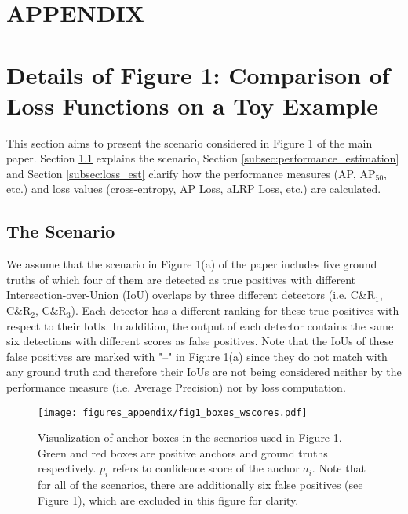 \documentclass{article}
\begin{document}
\section*{APPENDIX}




\renewcommand{\thefigure}{A.\arabic{figure}}
\renewcommand{\thetable}{A.\arabic{table}}
\renewcommand{\thetheorem}{A.\arabic{theorem}}
\renewcommand{\theequation}{A.\arabic{equation}}
\renewcommand{\thealgorithm}{A.\arabic{algorithm}}

\section{Details of Figure 1: Comparison of Loss Functions on a Toy Example}
\label{sec:Teaser}



This section aims to present the scenario considered in Figure 1 of the main paper. Section \ref{subsec:the_scenario} explains the scenario, Section \ref{subsec:performance_estimation} and Section \ref{subsec:loss_est} clarify how the performance measures (AP, $\mathrm{AP_{50}}$, etc.) and loss values (cross-entropy, AP Loss, aLRP Loss, etc.) are calculated.

\subsection{The Scenario}
\label{subsec:the_scenario}
We assume that the scenario in Figure 1(a) of the paper includes five ground truths of which four of them are detected as true positives with different Intersection-over-Union (IoU) overlaps by three different detectors (i.e. $\mathrm{C\&R_1}$, $\mathrm{C\&R_2}$, $\mathrm{C\&R_3}$). Each detector has a different ranking for these true positives with respect to their IoUs. In addition, the output of each detector contains the same six detections with different scores as false positives. Note that the IoUs of these false positives are marked with "--" in Figure 1(a) since they do not match with any ground truth and therefore their IoUs are not being considered neither by the performance measure (i.e. Average Precision) nor by loss computation. 


\begin{figure}
\centering
\texttt{[image: figures\_appendix/fig1\_boxes\_wscores.pdf]}
\caption{Visualization of anchor boxes in the scenarios used in Figure 1. Green and red boxes are positive anchors and  ground truths respectively. $p_i$ refers to confidence score of the anchor $a_i$. Note that for all of the scenarios, there are additionally six false positives (see Figure 1), which are excluded in this figure for clarity.}
\label{fig:fig_regressors}
\end{figure}
\end{document}
